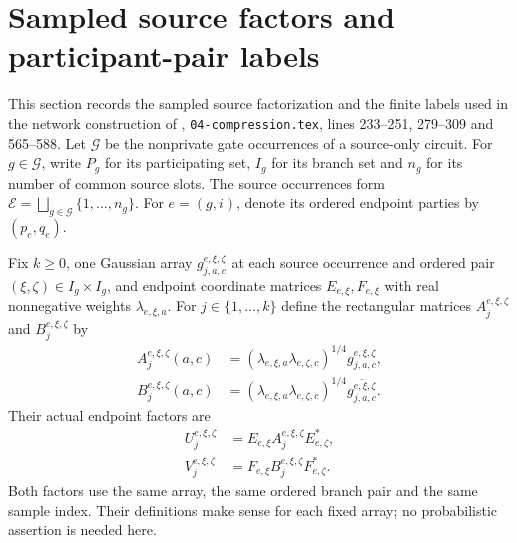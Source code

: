 \section{Sampled source factors and participant-pair labels}
\label{sec:peps_sampled_source_network}

This section records the sampled source factorization and the finite labels
used in the network construction of
\cite[proof of Theorem~5.2]{OpenAI2026PolynomialPEPS},
\texttt{04-compression.tex}, lines 233--251, 279--309 and 565--588.
Let $\mathcal G$ be the nonprivate gate occurrences of a source-only circuit.
For $g\in\mathcal G$, write $P_g$ for its participating set, $I_g$ for its
branch set and $n_g$ for its number of common source slots. The source
occurrences form $\mathcal E=\bigsqcup_{g\in\mathcal G}\{1,\ldots,n_g\}$.
For $e=(g,i)$, denote its ordered endpoint parties by $(p_e,q_e)$.

\begin{definition}
    \label{def:peps_sampled_source_factors}
    \leanok
    Fix $k\ge0$, one Gaussian array $g^{e,\xi,\zeta}_{j,a,c}$ at each source
    occurrence and ordered pair $(\xi,\zeta)\in I_g\times I_g$, and endpoint
    coordinate matrices $E_{e,\xi},F_{e,\xi}$ with real nonnegative weights
    $\lambda_{e,\xi,a}$. For $j\in\{1,\ldots,k\}$ define the rectangular
    matrices $A^{e,\xi,\zeta}_j$ and $B^{e,\xi,\zeta}_j$ by
    \begin{align}
        A^{e,\xi,\zeta}_j(a,c)
        &= (\lambda_{e,\xi,a}\lambda_{e,\zeta,c})^{1/4}
           g^{e,\xi,\zeta}_{j,a,c}, \\
        B^{e,\xi,\zeta}_j(a,c)
        &= (\lambda_{e,\xi,a}\lambda_{e,\zeta,c})^{1/4}
           \overline{g^{e,\xi,\zeta}_{j,a,c}}.
    \end{align}
    Their actual endpoint factors are
    \begin{align}
        U^{e,\xi,\zeta}_j
        &=E_{e,\xi}A^{e,\xi,\zeta}_jE_{e,\zeta}^{*}, \\
        V^{e,\xi,\zeta}_j
        &=F_{e,\xi}B^{e,\xi,\zeta}_jF_{e,\zeta}^{*}.
    \end{align}
    Both factors use the same array, the same ordered branch pair and the
    same sample index. Their definitions make sense for each fixed array;
    no probabilistic assertion is needed here.
\end{definition}

